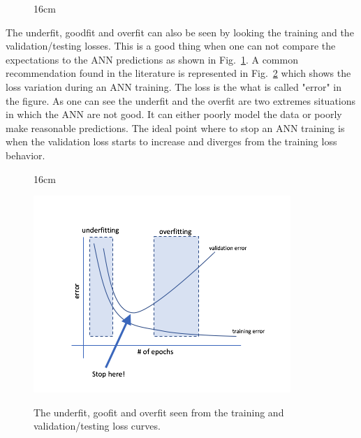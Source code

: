 \begin{figure}[hbtp]{16cm}
	\label{fig:training_issues}
\end{figure}

The underfit, goodfit and overfit can also be seen by looking the training and the validation/testing losses. This is a good thing when one can not compare the expectations to the ANN predictions as shown in Fig.~\ref{fig:training_issues}. A common recommendation found in the literature \cite{bib:SimonHaykin,bib:KevinGurney,bib:GlorotAndBendio2010,bib:NairAndHinton2010,bib:Zeiler_et_al2013,bib:glouppe-ESWB-2018-1} is represented in Fig.~\ref{fig:learning_curves} which shows the loss variation during an ANN training. The loss is the what is called "error" in the figure. As one can see the underfit and the overfit are two extremes situations in which the ANN are not good. It can either poorly model the data or poorly make reasonable predictions. The ideal point where to stop an ANN training is when the validation loss starts to increase and diverges from the training loss behavior.

\begin{figure}[hbtp]{16cm}
	\caption{The underfit, goofit and overfit seen from the training and validation/testing loss curves.}
	\centering
	\includegraphics[scale=0.8,trim={2cm 0cm 0cm 2cm},clip]{Slides/figs/early_stop}
	\label{fig:learning_curves}
\end{figure}

